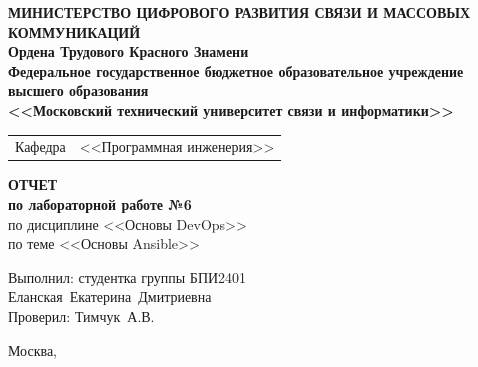 \thispagestyle{empty}

\begin{center}
	\textbf{МИНИСТЕРСТВО ЦИФРОВОГО РАЗВИТИЯ СВЯЗИ И МАССОВЫХ КОММУНИКАЦИЙ} \\
	\textbf{Ордена Трудового Красного Знамени \\
	Федеральное государственное бюджетное образовательное учреждение высшего образования \\
	<<Московский технический университет связи и информатики>>}
\end{center}

\vspace{0.3em}

\begin{center}
	\begin{tabularx}{0.5\textwidth}{p{1.2cm}X}
		Кафедра & \quad <<Программная инженерия>> \\%
	\end{tabularx}
\end{center}

\vspace{12em}

\begin{center}
	\Large
	\textbf{ОТЧЕТ} \\
	\textbf{по лабораторной работе №6} \\
	\large
	по дисциплине <<Основы DevOps>> \\
	по теме <<Основы Ansible>>
\end{center}


\vspace{3em}

\begin{flushright}
	Выполнил: 
	студентка группы БПИ2401 \\
	Еланская~Екатерина~Дмитриевна\\
	Проверил: Тимчук~А.В.\\
\end{flushright}

\vspace{8em}

\begin{center}
	Москва,~\the\year
\end{center}
\clearpage


